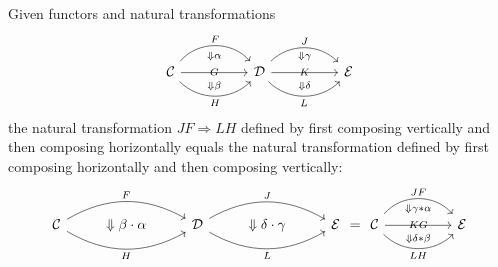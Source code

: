\documentclass[12pt, oneside]{book}
\begin{document}
\begin{lemma}
    \label{lem: middle four interchange}
    Given functors and natural transformations
    \begin{equation*}
        \begin{tikzcd}
            \mathcal{C}
            \arrow[rr, bend left=50, "F"]
            \arrow[rr,, "G"{yshift=-1ex},"\Downarrow \alpha"{yshift=1.5ex},"\Downarrow \beta"{yshift=-3.5ex}]
            \arrow[rr, bend right=45, "H"']
            &  &
            \mathcal{D}
            \arrow[rr, bend left=45, "J"]
            \arrow[rr, "K"{yshift=-1ex},,"\Downarrow \gamma"{yshift=1.5ex},"\Downarrow \delta"{yshift=-3.5ex}]
            \arrow[rr, bend right=45, "L"']&&
            \mathcal{E}
        \end{tikzcd}
    \end{equation*}
    the natural transformation $J F \Rightarrow L H$ defined by first composing vertically and then composing horizontally equals the natural transformation defined by first composing horizontally and then composing vertically:
    \begin{equation*}
        \begin{tikzcd}
            \mathcal{C} \arrow[rr,bend left ,"F"] \arrow[rr,bend right,"H"']&\Downarrow \beta \cdot \alpha &
            \mathcal{D}\arrow[rr,bend left ,"J"] \arrow[rr,bend right,"L"']&\Downarrow \delta \cdot \gamma &
            \mathcal{E}
        \end{tikzcd}=
        \begin{tikzcd}
            \mathcal{C} \arrow[rr, bend left=50, "JF"]
            \arrow[rr,, "KG"{yshift=-1ex},"\Downarrow \gamma*\alpha"{yshift=1.5ex},"\Downarrow \delta*\beta"{yshift=-3.5ex}]
            \arrow[rr, bend right=45, "LH"'] &&\mathcal{E}
        \end{tikzcd}
    \end{equation*}
\end{lemma}
\end{document}
